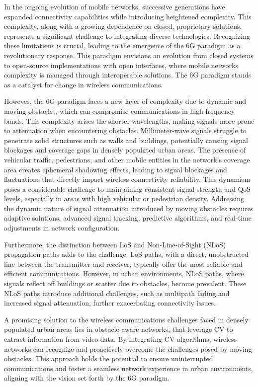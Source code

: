 In the ongoing evolution of mobile networks, successive generations have expanded connectivity capabilities while introducing heightened complexity.
This complexity, along with a growing dependence on closed, proprietary solutions, represents a significant challenge to integrating diverse technologies.
Recognizing these limitations is crucial, leading to the emergence of the 6G paradigm as a revolutionary response.
This paradigm envisions an evolution from closed systems to open-source implementations with open interfaces, where mobile networks complexity is managed through interoperable solutions.
The 6G paradigm stands as a catalyst for change in wireless communications.

However, the 6G paradigm faces a new layer of complexity due to dynamic and moving obstacles,  which can compromise communications in high-frequency bands.
This complexity arises the shorter wavelengths, making signals more prone to attenuation when encountering obstacles.
Millimeter-wave signals struggle to penetrate solid structures such as walls and buildings, potentially causing signal blockages and coverage gaps in densely populated urban areas.
The presence of vehicular traffic, pedestrians, and other mobile entities in the network's coverage area creates ephemeral shadowing effects, leading to signal blockages and fluctuations that directly impact wireless connectivity reliability.
This dynamism poses a considerable challenge to maintaining consistent signal strength and QoS levels, especially in areas with high vehicular or pedestrian density.
Addressing the dynamic nature of signal attenuation introduced by moving obstacles requires adaptive solutions, advanced signal tracking, predictive algorithms, and real-time adjustments in network configuration.

Furthermore, the distinction between LoS and Non-Line-of-Sight (NLoS) propagation paths adds to the challenge.
LoS paths, with a direct, unobstructed line between the transmitter and receiver, typically offer the most reliable and efficient communications.
However, in urban environments, NLoS paths, where signals reflect off buildings or scatter due to obstacles, become prevalent.
These NLoS paths introduce additional challenges, such as multipath fading and increased signal attenuation, further exacerbating connectivity issues.

A promising solution to the wireless communications challenges faced in densely populated urban areas lies in obstacle-aware networks, that leverage CV to extract information from video data.
By integrating CV algorithms, wireless networks can recognize and proactively overcome the challenges posed by moving obstacles.
This approach holds the potential to ensure uninterrupted communications and foster a seamless network experience in urban environments, aligning with the vision set forth by the 6G paradigm.

